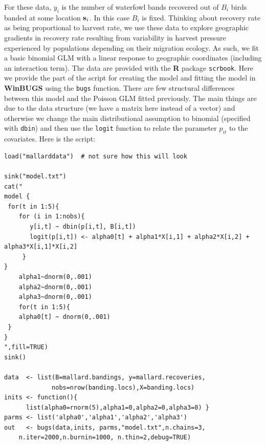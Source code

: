 For these data, $y_i$ is the number of waterfowl bands recovered out
of $B_i$ birds banded at some location ${\bf s}_{i}$. In this case $B_{i}$ is
fixed. Thinking about recovery rate as being proportional to harvest
rate, we use these data to explore geographic gradients in recovery rate
resulting from variability in harvest pressure experienced by
populations depending on their migration ecology. As such, we fit a
basic binomial GLM with a linear response to geographic coordinates
(including an interaction term). The data are provided with the {\bf
  R} package \mbox{\tt scrbook}. Here we
 provide the part of the script for creating the model and fitting the
 model in
{\bf WinBUGS} using the \mbox{\tt bugs} function.
There are few structural differences between this model and the
Poisson GLM fitted previously. The main things are due to the data
structure (we have a matrix here instead of a vector) and otherwise we
change the main distributional assumption to binomial (specified with
\mbox{\tt dbin}) and then use the \mbox{\tt logit} function to relate
the parameter $p_{it}$ to the covariates.  Here is the script:

{\small
\begin{verbatim}
load("mallarddata")  # not sure how this will look

sink("model.txt")
cat("
model {
 for(t in 1:5){
    for (i in 1:nobs){
       y[i,t] ~ dbin(p[i,t], B[i,t])
       logit(p[i,t]) <- alpha0[t] + alpha1*X[i,1] + alpha2*X[i,2] + alpha3*X[i,1]*X[i,2]
     }
}
	alpha1~dnorm(0,.001)
	alpha2~dnorm(0,.001)
	alpha3~dnorm(0,.001)
	for(t in 1:5){
 	alpha0[t] ~ dnorm(0,.001)
 }
}
",fill=TRUE)
sink()

data  <- list(B=mallard.bandings, y=mallard.recoveries,
             nobs=nrow(banding.locs),X=banding.locs)
inits <- function(){
      list(alpha0=rnorm(5),alpha1=0,alpha2=0,alpha3=0) }
parms <- list('alpha0','alpha1','alpha2','alpha3')
out   <- bugs(data,inits, parms,"model.txt",n.chains=3,
 	n.iter=2000,n.burnin=1000, n.thin=2,debug=TRUE)
\end{verbatim}
}



